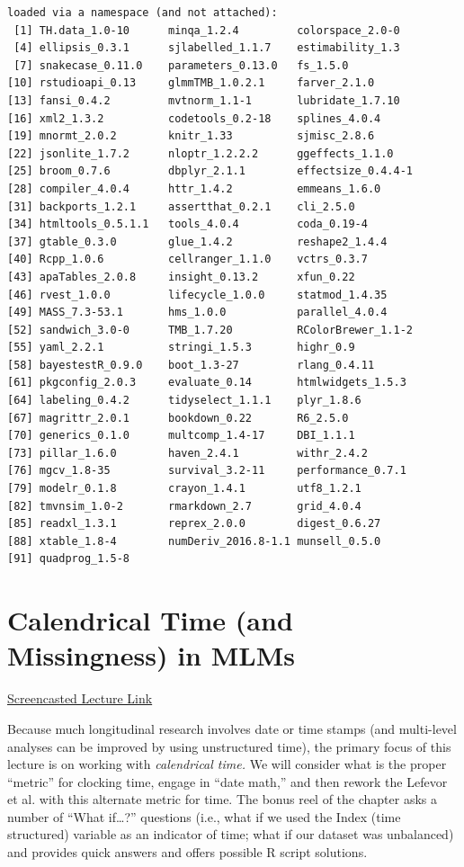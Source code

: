 \documentclass[
  english,
]{book}
\begin{document}
\begin{verbatim}
loaded via a namespace (and not attached):
 [1] TH.data_1.0-10      minqa_1.2.4         colorspace_2.0-0   
 [4] ellipsis_0.3.1      sjlabelled_1.1.7    estimability_1.3   
 [7] snakecase_0.11.0    parameters_0.13.0   fs_1.5.0           
[10] rstudioapi_0.13     glmmTMB_1.0.2.1     farver_2.1.0       
[13] fansi_0.4.2         mvtnorm_1.1-1       lubridate_1.7.10   
[16] xml2_1.3.2          codetools_0.2-18    splines_4.0.4      
[19] mnormt_2.0.2        knitr_1.33          sjmisc_2.8.6       
[22] jsonlite_1.7.2      nloptr_1.2.2.2      ggeffects_1.1.0    
[25] broom_0.7.6         dbplyr_2.1.1        effectsize_0.4.4-1 
[28] compiler_4.0.4      httr_1.4.2          emmeans_1.6.0      
[31] backports_1.2.1     assertthat_0.2.1    cli_2.5.0          
[34] htmltools_0.5.1.1   tools_4.0.4         coda_0.19-4        
[37] gtable_0.3.0        glue_1.4.2          reshape2_1.4.4     
[40] Rcpp_1.0.6          cellranger_1.1.0    vctrs_0.3.7        
[43] apaTables_2.0.8     insight_0.13.2      xfun_0.22          
[46] rvest_1.0.0         lifecycle_1.0.0     statmod_1.4.35     
[49] MASS_7.3-53.1       hms_1.0.0           parallel_4.0.4     
[52] sandwich_3.0-0      TMB_1.7.20          RColorBrewer_1.1-2 
[55] yaml_2.2.1          stringi_1.5.3       highr_0.9          
[58] bayestestR_0.9.0    boot_1.3-27         rlang_0.4.11       
[61] pkgconfig_2.0.3     evaluate_0.14       htmlwidgets_1.5.3  
[64] labeling_0.4.2      tidyselect_1.1.1    plyr_1.8.6         
[67] magrittr_2.0.1      bookdown_0.22       R6_2.5.0           
[70] generics_0.1.0      multcomp_1.4-17     DBI_1.1.1          
[73] pillar_1.6.0        haven_2.4.1         withr_2.4.2        
[76] mgcv_1.8-35         survival_3.2-11     performance_0.7.1  
[79] modelr_0.1.8        crayon_1.4.1        utf8_1.2.1         
[82] tmvnsim_1.0-2       rmarkdown_2.7       grid_4.0.4         
[85] readxl_1.3.1        reprex_2.0.0        digest_0.6.27      
[88] xtable_1.8-4        numDeriv_2016.8-1.1 munsell_0.5.0      
[91] quadprog_1.5-8     
\end{verbatim}

\hypertarget{TimeLord}{%
\chapter{Calendrical Time (and Missingness) in MLMs}\label{TimeLord}}

\href{https://spu.hosted.panopto.com/Panopto/Pages/Viewer.aspx?pid=5ea38416-c682-49f8-ba71-ad390025e36e}{Screencasted Lecture Link}

Because much longitudinal research involves date or time stamps (and multi-level analyses can be improved by using unstructured time), the primary focus of this lecture is on working with \emph{calendrical time.} We will consider what is the proper ``metric'' for clocking time, engage in ``date math,'' and then rework the Lefevor et al.\citeyearpar{lefevor_religious_2017} with this alternate metric for time. The bonus reel of the chapter asks a number of ``What if\ldots?'' questions (i.e., what if we used the Index (time structured) variable as an indicator of time; what if our dataset was unbalanced) and provides quick answers and offers possible R script solutions.
\end{document}
